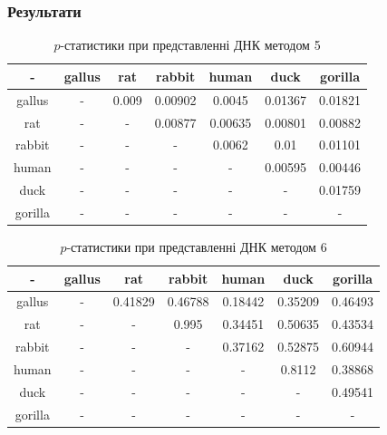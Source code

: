 \documentclass[mathserif,serif,10pt]{beamer}
\begin{document}
\begin{frame}
\frametitle{Результати}


\begin{table}[h!]
\begin{center}
\begin{tabular}{|c|c|c|c|c|c|c|}
\hline
- & gallus & rat & rabbit & human & duck & gorilla \\ \hline
gallus & - & 0.009 & 0.00902 & 0.0045 & 0.01367 & 0.01821 \\ \hline
rat & - & - & 0.00877 & 0.00635 & 0.00801 & 0.00882 \\ \hline
rabbit & - & - & - & 0.0062 & 0.01 & 0.01101 \\ \hline
human & - & - & - & - & 0.00595 & 0.00446 \\ \hline
duck & - & - & - & - & - & 0.01759 \\ \hline
gorilla & - & - & - & - & - & - \\ \hline
\end{tabular}
\end{center}
\caption{$p$-статистики при представленні ДНК методом 5}
\label{table:res5}
\end{table}

\begin{table}[h!]
\begin{center}
\begin{tabular}{|c|c|c|c|c|c|c|}
\hline
- & gallus & rat & rabbit & human & duck & gorilla \\ \hline
gallus & - & 0.41829 & 0.46788 & 0.18442 & 0.35209 & 0.46493 \\ \hline
rat & - & - & 0.995 & 0.34451 & 0.50635 & 0.43534 \\ \hline
rabbit & - & - & - & 0.37162 & 0.52875 & 0.60944 \\ \hline
human & - & - & - & - & 0.8112 & 0.38868 \\ \hline
duck & - & - & - & - & - & 0.49541 \\ \hline
gorilla & - & - & - & - & - & - \\ \hline
\end{tabular}
\end{center}
\caption{$p$-статистики при представленні ДНК методом 6}
\label{table:res6}
\end{table}

\end{frame}
\end{document}

